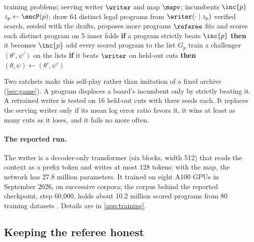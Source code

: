 \begin{algorithm}[tb]
\caption{The self-play loop (training).}\label{alg:selfplay}
\begin{algorithmic}[1]
\Require training problems; serving writer $\writer$ and map $\mapv$; incumbents $\inc{p}$
    \State $z_p \gets \encP(p)$; draw 64 distinct legal programs from $\writer(\cdot\mid z_p)$ 
    \State verified search, seeded with the drafts, proposes more programs 
    \State $\referee$ fits and scores each distinct program on 5 inner folds 
    \State \textbf{if} a program strictly beats $\inc{p}$ \textbf{then} it becomes $\inc{p}$ 
    \State add every scored program to the list $G_p$ 
  \EndFor
  \State train a challenger $(\theta',\psi')$ on the lists
  \State \textbf{if} it beats $\writer$ on held-out cuts \textbf{then} $(\theta,\psi)\gets(\theta',\psi')$ 
\EndFor
\end{algorithmic}
\end{algorithm}

Two ratchets make this self-play rather than imitation of a fixed archive (\cref{sec:game}). A
program displaces a board's incumbent only by strictly beating it. A retrained writer is tested on 16
held-out cuts with three seeds each. It replaces the serving writer only if its mean log error ratio
favors it, it wins at least as many cuts as it loses, and it fails no more often.

\paragraph{The reported run.} The writer is a decoder-only transformer (six blocks, width 512)
that reads the context as a prefix token and writes at most 128 tokens; with the map, the network
has 27.8 million parameters. It trained on eight A100 GPUs in September 2026, on successive
corpora; the corpus behind the reported checkpoint, step 60,000, holds about 10.2 million scored
programs from 80 training datasets . Details are in \cref{app:training}.

\subsection{Keeping the referee honest}\label{sub:method-referee}

